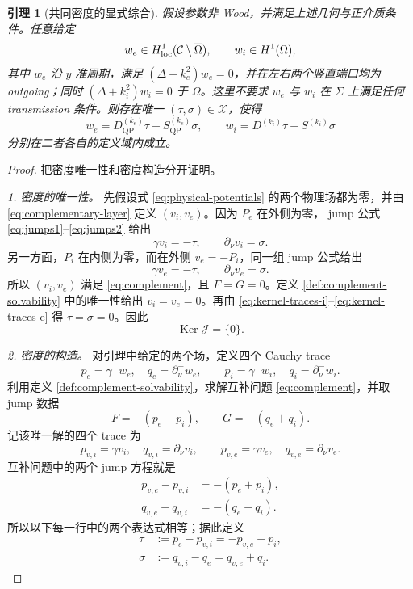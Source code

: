 \documentclass[UTF8,11pt,fontset=fandol]{ctexart}
\newcommand{\C}{\mathcal C}
\newcommand{\Om}{\Omega}
\newcommand{\Sig}{\Sigma}
\newcommand{\QP}{\mathrm{QP}}
\newcommand{\Ker}{\operatorname{Ker}}
\theoremstyle{plain}
\newtheorem{lemma}[theorem]{引理}
\theoremstyle{definition}
\theoremstyle{remark}
\begin{document}
\begin{lemma}[共同密度的显式综合]
\label{lem:synthesis}
假设参数非 Wood，并满足上述几何与正介质条件。任意给定
\[
w_e\in H^1_{\rm loc}(\C\setminus\overline\Om),
\qquad w_i\in H^1(\Om),
\]
其中 \(w_e\) 沿 \(y\) 准周期，满足
\((\Delta+k_e^2)w_e=0\)，并在左右两个竖直端口均为 outgoing；同时
\((\Delta+k_i^2)w_i=0\) 于 \(\Om\)。这里不要求 \(w_e\) 与 \(w_i\) 在
\(\Sig\) 上满足任何 transmission 条件。则存在唯一
\((\tau,\sigma)\in\mathcal X\)，使得
\begin{equation}
w_e=D_{\QP}^{(k_e)}\tau+S_{\QP}^{(k_e)}\sigma,
\qquad
w_i=D^{(k_i)}\tau+S^{(k_i)}\sigma
\label{eq:synthesis-target}
\end{equation}
分别在二者各自的定义域内成立。
\end{lemma}

\begin{proof}
把密度唯一性和密度构造分开证明。

\emph{1. 密度的唯一性。}
先假设式 \eqref{eq:physical-potentials} 的两个物理场都为零，并由
\eqref{eq:complementary-layer} 定义 \((v_i,v_e)\)。因为 \(P_e\) 在外侧为零，
jump 公式 \eqref{eq:jumps1}--\eqref{eq:jumps2} 给出
\begin{equation}
\gamma v_i=-\tau,\qquad \partial_\nu v_i=\sigma.
\label{eq:kernel-traces-i}
\end{equation}
另一方面，\(P_i\) 在内侧为零，而在外侧 \(v_e=-P_i\)，同一组 jump 公式给出
\begin{equation}
\gamma v_e=-\tau,\qquad \partial_\nu v_e=\sigma.
\label{eq:kernel-traces-e}
\end{equation}
所以 \((v_i,v_e)\) 满足 \eqref{eq:complement}，且 \(F=G=0\)。定义
\ref{def:complement-solvability} 中的唯一性给出 \(v_i=v_e=0\)。再由
\eqref{eq:kernel-traces-i}--\eqref{eq:kernel-traces-e} 得
\(\tau=\sigma=0\)。因此
\begin{equation}
\Ker\mathcal J=\{0\}.
\label{eq:Jinjective}
\end{equation}

\emph{2. 密度的构造。}
对引理中给定的两个场，定义四个 Cauchy trace
\begin{equation}
p_e=\gamma^+w_e,\quad q_e=\partial_\nu^+w_e,
\qquad
p_i=\gamma^-w_i,\quad q_i=\partial_\nu^-w_i.
\label{eq:w-traces}
\end{equation}
利用定义 \ref{def:complement-solvability}，求解互补问题
\eqref{eq:complement}，并取 jump 数据
\begin{equation}
F=-(p_e+p_i),\qquad G=-(q_e+q_i).
\label{eq:complement-data-from-w}
\end{equation}
记该唯一解的四个 trace 为
\[
p_{v,i}=\gamma v_i,\quad q_{v,i}=\partial_\nu v_i,
\qquad
p_{v,e}=\gamma v_e,\quad q_{v,e}=\partial_\nu v_e.
\]
互补问题中的两个 jump 方程就是
\begin{align}
p_{v,e}-p_{v,i}&=-(p_e+p_i),\label{eq:vjump-p}\\
q_{v,e}-q_{v,i}&=-(q_e+q_i).\label{eq:vjump-q}
\end{align}
所以以下每一行中的两个表达式相等；据此定义
\begin{align}
\tau&:=p_e-p_{v,i}=-p_{v,e}-p_i,\label{eq:density-tau}\\
\sigma&:=q_{v,i}-q_e=q_{v,e}+q_i.\label{eq:density-sigma}
\end{align}


\end{proof}
\end{document}
